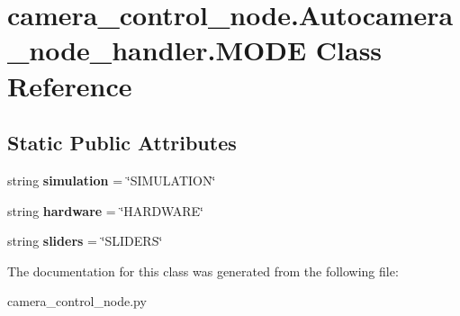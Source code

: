 \hypertarget{classcamera__control__node_1_1Autocamera__node__handler_1_1MODE}{\section{camera\-\_\-control\-\_\-node.\-Autocamera\-\_\-node\-\_\-handler.\-M\-O\-D\-E Class Reference}
\label{classcamera__control__node_1_1Autocamera__node__handler_1_1MODE}
}
\subsection*{Static Public Attributes}
\begin{DoxyCompactItemize}
\item 
\hypertarget{classcamera__control__node_1_1Autocamera__node__handler_1_1MODE_a0f203fe362cf59298c498dd8b0ae3bfe}{string {\bfseries simulation} = \char`\"{}S\-I\-M\-U\-L\-A\-T\-I\-O\-N\char`\"{}}\label{classcamera__control__node_1_1Autocamera__node__handler_1_1MODE_a0f203fe362cf59298c498dd8b0ae3bfe}

\item 
\hypertarget{classcamera__control__node_1_1Autocamera__node__handler_1_1MODE_acc2686492359f88a23454ea404e64ad1}{string {\bfseries hardware} = \char`\"{}H\-A\-R\-D\-W\-A\-R\-E\char`\"{}}\label{classcamera__control__node_1_1Autocamera__node__handler_1_1MODE_acc2686492359f88a23454ea404e64ad1}

\item 
\hypertarget{classcamera__control__node_1_1Autocamera__node__handler_1_1MODE_afab781231cec4a27629fbce001dc397a}{string {\bfseries sliders} = \char`\"{}S\-L\-I\-D\-E\-R\-S\char`\"{}}\label{classcamera__control__node_1_1Autocamera__node__handler_1_1MODE_afab781231cec4a27629fbce001dc397a}

\end{DoxyCompactItemize}


The documentation for this class was generated from the following file\-:\begin{DoxyCompactItemize}
\item 
camera\-\_\-control\-\_\-node.\-py\end{DoxyCompactItemize}
